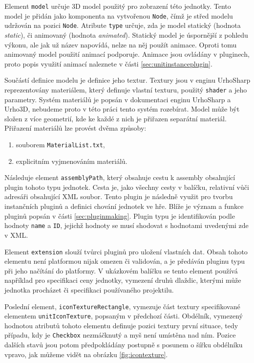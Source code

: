 Element \texttt{model} určuje 3D model použitý pro zobrazení této jednotky. Tento model je přidán jako komponenta na vytvořenou \texttt{Node}, čímž je střed modelu udržován na pozici \texttt{Node}. Atribute \texttt{type} určuje, zda je model statický (hodnota \textit{static}), či animovaný (hodnota \textit{animated}). Statický model je úspornější z pohledu výkonu, ale jak už název napovídá, nelze na něj použít animace. Oproti tomu animovaný model použití animací podporuje. Animace jsou ovládány v pluginech, proto popis využití animací naleznete v části \ref{sec:unitinstanceplugin}.

Součástí definice modelu je definice jeho textur. Textury jsou v enginu UrhoSharp reprezentovány materiálem, který definuje vlastní texturu, použitý \texttt{shader} a jeho parametry. Systém materiálů je popsán v dokumentaci enginu UrhoSharp a Urho3D, nebudeme proto v této práci tento systém rozebírat. Model může být složen z více geometrií, kde ke každé z nich je přiřazen separátní materiál. Přiřazení materiálů lze provést dvěma způsoby:

\begin{enumerate}
	\item souborem \texttt{MaterialList.txt},
	\item explicitním vyjmenováním materiálů.
\end{enumerate}

Následuje element \texttt{assemblyPath}, který obsahuje cestu k assembly obsahující plugin tohoto typu jednotek. Cesta je, jako všechny cesty v balíčku, relativní vůči adresáři obsahující XML soubor. Tento plugin je následně využit pro tvorbu instančních pluginů a definici chování jednotek ve hře. Blíže je význam a funkce pluginů popsán v části \ref{sec:pluginmaking}. Plugin typu je identifikován podle hodnoty \texttt{name} a \texttt{ID}, jejichž hodnoty se musí shodovat s hodnotami uvedenými zde v XML. 

Element \texttt{extension} slouží tvůrci pluginů pro uložení vlastních dat. Obsah tohoto elementu není platformou nijak omezen či validován, a je předáván pluginu typu při jeho načítání do platformy. V ukázkovém balíčku se tento element používá například pro specifikaci ceny jednotky, vymezení druhů dlaždic, kterými může jednotka procházet či specifikaci používaného projektilu.

Poslední element, \texttt{iconTextureRectangle}, vymezuje část textury specifikované elementem \texttt{unitIconTexture}, popsaným v předchozí části. Obdélník, vymezený hodnotou atributů tohoto elementu definuje pozici textury první situace, tedy případu, kdy je \texttt{Checkbox} nezmáčknutý a myš není umístěna nad ním. Pozice dalších stavů jsou potom předpokládány postupně s posunem o šířku obdélníku vpravo, jak můžeme vidět na obrázku \ref{fig:icontexture}.


